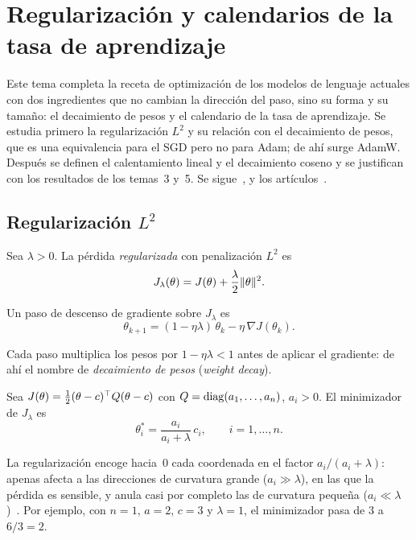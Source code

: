 \chapter{Regularización y calendarios de la tasa de aprendizaje}
\label{tema:6}

Este tema completa la receta de optimización de los modelos de lenguaje actuales con dos ingredientes que no cambian la dirección del paso, sino su forma y su tamaño: el decaimiento de pesos y el calendario de la tasa de aprendizaje. Se estudia primero la regularización $L^{2}$ y su relación con el decaimiento de pesos, que es una equivalencia para el SGD pero no para Adam; de ahí surge AdamW. Después se definen el calentamiento lineal y el decaimiento coseno y se justifican con los resultados de los temas~3 y~5. Se sigue~\cite[§7.1]{gbc}, \cite[§12.11]{d2l} y los artículos~\cite{adamw,sgdr,goyal}.

\section{Regularización \texorpdfstring{$L^{2}$}{L2}}

\begin{definicion}[Regularización $L^{2}$]\label{def:l2}
Sea $\lambda>0$. La pérdida \emph{regularizada} con penalización $L^{2}$ es
\[
J_\lambda(\theta)=J(\theta)+\frac{\lambda}{2}\lVert\theta\rVert^{2}.
\]
\end{definicion}

\begin{proposicion}[Encogimiento]\label{prop:encogimiento}
Un paso de descenso de gradiente sobre $J_\lambda$ es
\[
\theta_{k+1}=(1-\eta\lambda)\,\theta_k-\eta\,\nabla J(\theta_k).
\]
\end{proposicion}

Cada paso multiplica los pesos por $1-\eta\lambda<1$ antes de aplicar el gradiente: de ahí el nombre de \emph{decaimiento de pesos} (\emph{weight decay}).

\begin{proposicion}\label{prop:ridge}
Sea $J(\theta)=\frac12(\theta-c)^{\top} Q(\theta-c)$ con $Q=\operatorname{diag}(a_1,\dots,a_n)$, $a_i>0$. El minimizador de $J_\lambda$ es
\[
\theta^{\ast}_i=\frac{a_i}{a_i+\lambda}\,c_i,\qquad i=1,\dots,n.
\]
\end{proposicion}

La regularización encoge hacia~0 cada coordenada en el factor $a_i/(a_i+\lambda)$: apenas afecta a las direcciones de curvatura grande ($a_i\gg\lambda$), en las que la pérdida es sensible, y anula casi por completo las de curvatura pequeña ($a_i\ll\lambda$)~\cite[§7.1.1]{gbc}. Por ejemplo, con $n=1$, $a=2$, $c=3$ y $\lambda=1$, el minimizador pasa de $3$ a $6/3=2$.

